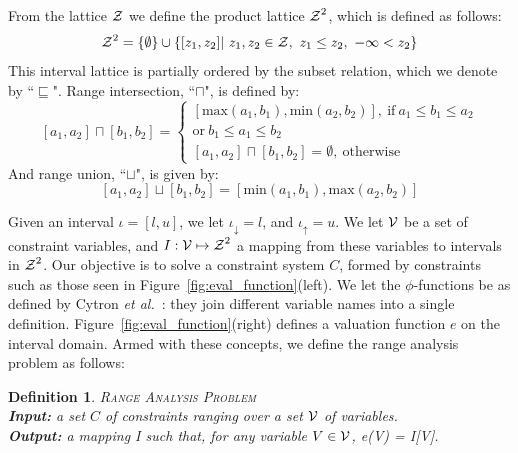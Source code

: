 \documentclass[preprint]{sigplanconf}[10pt]
\newtheorem{definition}[section]{Definition}
\newcommand{\lb}[1]{#1_{\downarrow}}
\newcommand{\ub}[1]{#1_{\uparrow}}
\newcommand{\varset}[1]{\mbox{$\cal{#1}$}}
\begin{document}
From the lattice $\varset{Z}$ we define the product lattice
$\varset{Z}^2$, which is defined as follows:
%
\begin{equation*}
\varset{Z}^2 = \{ \emptyset \} \cup \{[z_1, z_2] | \ z_1,z_2 \in \varset{Z},
\ z_1 \leq z_2, \  -\infty < z_2 \}
\end{equation*}
%
This interval lattice is partially ordered by the subset relation, which we
denote by ``$\sqsubseteq$".
Range intersection, ``$\sqcap$", is defined by:
\[
[a_1, a_2] \sqcap [b_1, b_2] =
\begin{cases}
[\mbox{max}(a_1, b_1), \mbox{min}(a_2, b_2)], \ \mbox{if} \ a_1 \leq b_1 \leq a_2  \\ \mbox{or} \ b_1 \leq a_1 \leq b_2 \\
[a_1, a_2] \sqcap [b_1, b_2] = \emptyset, \ \mbox{otherwise}
\end{cases}
\]
And range union, ``$\sqcup$", is given by:
\[
[a_1, a_2] \sqcup [b_1, b_2] = [\mbox{min}(a_1, b_1), \mbox{max}(a_2, b_2)]
\]

Given an interval $\iota = [l, u]$, we let $\lb{\iota} = l$, and
$\ub{\iota} = u$.
We let \varset{V} be a set of constraint variables, and
$I: \varset{V} \mapsto \varset{Z}^2$ a
mapping from these variables to intervals in $\varset{Z}^2$.
Our objective is to solve a constraint system $C$, formed by constraints such
as those seen in Figure~\ref{fig:eval_function}(left).
We let the $\phi$-functions be as defined by Cytron
{\em et al.}~\cite{Cytron91}: they join different variable names into a single
definition.
Figure~\ref{fig:eval_function}(right) defines a valuation function $e$ on the
interval domain.
Armed with these concepts, we define the range analysis problem as follows:

\begin{definition}
\label{def:rcp}
\textsc{Range Analysis Problem} \\
\textbf{Input:} a set $C$ of constraints ranging over a set \varset{V} of
variables. \\
\textbf{Output:} a mapping I such that, for any variable
$V \in \varset{V}$, e(V) = I[V].
\end{definition}
\end{document}
